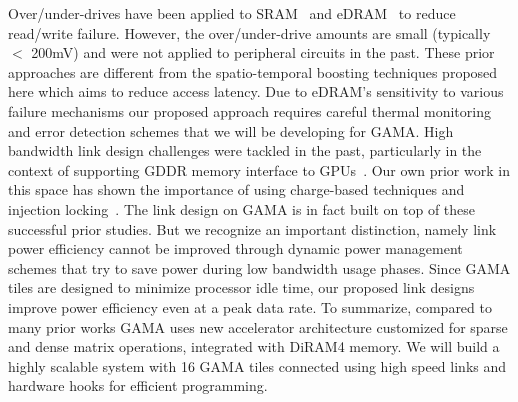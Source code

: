 Over/under-drives have been applied to SRAM~\cite{7046972, 6176988} and eDRAM~\cite{6757412} to reduce read/write failure. However, the over/under-drive amounts are small (typically $<$ 200mV) and were not applied to  peripheral circuits in the past. These prior approaches are different from the spatio-temporal boosting techniques proposed here which aims to reduce access latency. Due to eDRAM's sensitivity to various failure mechanisms our proposed approach requires careful thermal monitoring and error detection schemes that we will be developing for GAMA. High bandwidth link design challenges were tackled in the past, particularly in the context of supporting GDDR memory interface to GPUs~\cite{partovi2009single, kho201075}. Our own prior work in this space has shown the importance of using charge-based techniques and injection locking~\cite{saxena20152, elkholy201610}. The link design on GAMA is in fact built on top of these successful prior studies. But we recognize an important distinction, namely link power efficiency cannot be improved through dynamic power management schemes that try to save power during low bandwidth usage phases.   Since GAMA tiles are designed to minimize processor idle time,  our proposed link designs improve power efficiency even at a peak data rate. To summarize, compared to many prior works  GAMA uses  new accelerator architecture customized for sparse and dense  matrix operations,  integrated with DiRAM4 memory. We will build a highly scalable system with 16 GAMA tiles connected using high speed links and hardware hooks for efficient programming.  



\begin{comment}
Various spatio-temporal voltage boosting techniques have been applied to SRAM to reduce read/write failure of SRAM arrays at low voltage~\cite{}, 
while the failure mechanism of eDRAM arrays singificantly differs from that of SRAM arrays.
That is, such voltage boosting techniques have never been applied to eDRAM arrays especially to reduce the access latency.
\end{comment}


